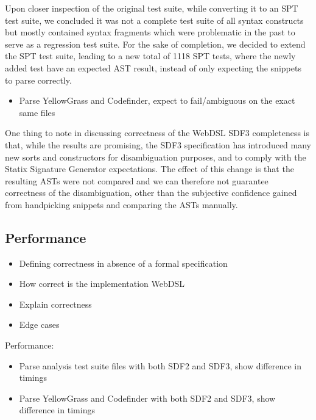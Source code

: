     Upon closer inspection of the original test suite, while converting it to an SPT test suite, we concluded it was not a complete test suite of all syntax constructs but mostly contained syntax fragments which were problematic in the past to serve as a regression test suite. For the sake of completion, we decided to extend the SPT test suite, leading to a new total of 1118 SPT tests, where the newly added test have an expected AST result, instead of only expecting the snippets to parse correctly.

    \begin{itemize}
      \item Parse YellowGrass and Codefinder, expect to fail/ambiguous on the exact same files
    \end{itemize}

    One thing to note in discussing correctness of the WebDSL SDF3 completeness is that, while the results are promising, the SDF3 specification has introduced many new sorts and constructors for disambiguation purposes, and to comply with the Statix Signature Generator expectations. The effect of this change is that the resulting ASTs were not compared and we can therefore not guarantee correctness of the disambiguation, other than the subjective confidence gained from handpicking snippets and comparing the ASTs manually.

  \subsection{Performance}

    \begin{itemize}
      \item Defining correctness in absence of a formal specification
      \item How correct is the implementation WebDSL
      \item Explain correctness
      \item Edge cases
    \end{itemize}

    Performance:

    \begin{itemize}
      \item Parse analysis test suite files with both SDF2 and SDF3, show difference in timings
      \item Parse YellowGrass and Codefinder with both SDF2 and SDF3, show difference in timings
    \end{itemize}

